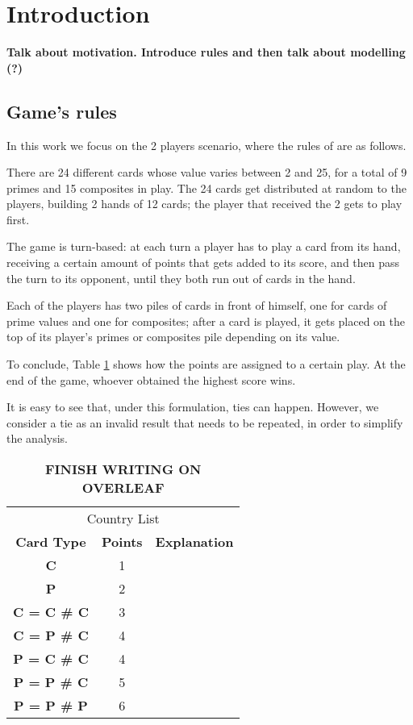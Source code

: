 \section{Introduction} \label{section:Introduction}%

\textbf{Talk about motivation. Introduce rules and then talk about modelling (?)}

\subsection{Game's rules}

In this work we focus on the 2 players scenario, where the rules of are as follows.

There are 24 different cards whose value varies between 2 and 25, for a total of 9 primes and 15 composites in play.
The 24 cards get distributed at random to the players, building 2 hands of 12 cards; the player that received the 2 gets to play first.

The game is turn-based: at each turn a player has to play a card from its hand, receiving a certain amount of points that gets added to its score, and then pass the turn to its opponent, until they both run out of cards in the hand.

Each of the players has two piles of cards in front of himself, one for cards of prime values and one for composites; after a card is played, it gets placed on the top of its player's primes or composites pile depending on its value.

To conclude, Table \ref{tab:points} shows how the points are assigned to a certain play. At the end of the game, whoever obtained the highest score wins.

It is easy to see that, under this formulation, ties can happen. However, we consider a tie as an invalid result that needs to be repeated, in order to simplify the analysis.

\begin{table}
	\centering
	\begin{tabular}{c|c|c}
		\multicolumn{3}{c}{Country List} \\
		\textbf{Card Type} & \textbf{Points} & \textbf{Explanation} \\
		\hline
		\hline
		\textbf{C} & 1  &  \\
		\hline
		\textbf{P}& 2 &  \\
		\hline
		\textbf{C = C \# C}& 3 &  \\
		\hline
		\textbf{C = P \# C}& 4 &  \\
		\hline
		\textbf{P = C \# C}& 4 &  \\
		\hline
		\textbf{P = P \# C}& 5 &  \\
		\hline
		\textbf{P = P \# P}& 6 &  \\
		\hline
	\end{tabular}
	\label{tab:points}
	\caption{\textbf{FINISH WRITING ON OVERLEAF}}
\end{table}